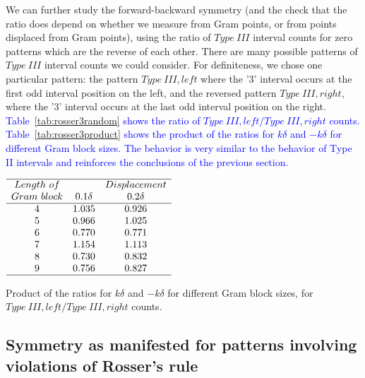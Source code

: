 \documentclass[twoside]{article}
\theoremstyle{definition}
\begin{document}
{We can further study the forward-backward symmetry (and the check that the ratio does depend on whether we measure from Gram points, or from points displaced from Gram points),  using the ratio of $Type~III$ interval counts for zero patterns which are the reverse of each other. There are many possible patterns of $Type~III$ interval counts we could consider. For definiteness, we chose one particular pattern: the pattern  $Type~III,left$  where the '3' interval occurs at the first odd interval position on the left, and the reversed pattern  $Type~III,right$,  where the '3' interval occurs at the last odd interval position on the right. \textcolor{blue}{
Table~\ref{tab:rosser3random} shows the ratio of $Type~III,left/Type~III,right$ counts. Table~\ref{tab:rosser3product} shows the product of the ratios for $k\delta$ and $-k\delta$ for different Gram block sizes.   The behavior  is very similar to the behavior of Type II intervals and reinforces the conclusions of the previous section.}

\begin{table}
\centering \(\begin{array}{ccc}
\hline
Length~of 	& &Displacement \\
Gram~block	 & 0.1\delta & 0.2\delta  \\
\hline
4 &1.035 & 0.926\\
5 &0.966& 1.025\\ 
6 &0.770& 0.771\\
7 &1.154& 1.113\\
8 &0.730& 0.832\\
9 &0.756& 0.827\\
\hline
\end{array}\)
\caption{ {Product of the ratios for $k\delta$ and $-k\delta$ for different Gram block sizes, for  $Type~III,left/Type~III,right$ counts.}}
\label{tab:rosser3product}
\end{table}

\subsection{\label{sec6a}Symmetry as manifested for patterns involving violations of Rosser's rule}

}
\end{document}
